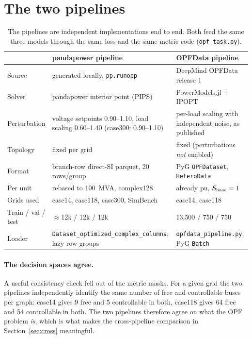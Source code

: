 \documentclass[10pt]{article}
\begin{document}
\section{The two pipelines}
\label{sec:pipelines}

\begin{table}[H]
\centering
\small
\begin{tabular}{p{}p{}p{}}
\toprule
 & \textbf{pandapower pipeline} & \textbf{OPFData pipeline} \\
\midrule
Source & generated locally, \texttt{pp.runopp} & DeepMind OPFData release 1 \\
Solver & pandapower interior point (PIPS) & PowerModels.jl + IPOPT \\
Perturbation & voltage setpoints 0.90--1.10, load scaling 0.60--1.40 (case300: 0.90--1.10) & per-load scaling with independent noise, as published \\
Topology & fixed per grid & fixed (perturbations \emph{not} enabled) \\
Format & branch-row direct-SI parquet, 20 rows/group & PyG \texttt{OPFDataset}, \texttt{HeteroData} \\
Per unit & rebased to 100~MVA, complex128 & already pu, \(S_{\rm base}=1\) \\
Grids used & case14, case118, case300, SimBench & case14, case118 \\
Train / val / test & \(\approx\)12k / 12k / 12k & 13{,}500 / 750 / 750 \\
Loader & \texttt{Dataset\_optimized\_}\-\texttt{complex\_columns}, lazy row groups & \texttt{opfdata\_pipeline.py}, PyG \texttt{Batch} \\
\bottomrule
\end{tabular}
\caption{The pipelines are independent implementations end to end. Both feed
the same three models through the same loss and the same metric code
(\texttt{opf\_task.py}).}
\end{table}

\paragraph{The decision spaces agree.} A useful consistency check fell out of
the metric masks. For a given grid the two pipelines independently identify the
same number of free and controllable buses per graph: case14 gives 9 free and 5
controllable in both, case118 gives 64 free and 54 controllable in both. The
two pipelines therefore agree on what the OPF problem \emph{is}, which is what
makes the cross-pipeline comparison in Section~\ref{sec:cross} meaningful.
\end{document}

